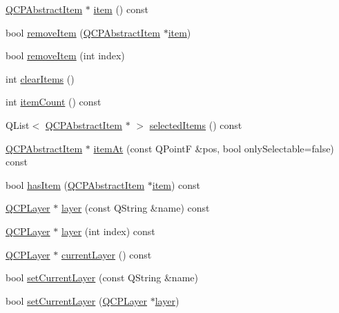 \begin{DoxyCompactItemize}
\item 
\mbox{\hyperlink{class_q_c_p_abstract_item}{Q\+C\+P\+Abstract\+Item}} $\ast$ \mbox{\hyperlink{class_q_custom_plot_a12eb2a283cf10a8a9176c01c0443e83e}{item}} () const
\item 
bool \mbox{\hyperlink{class_q_custom_plot_ae04446557292551e8fb6e2c106e1848d}{remove\+Item}} (\mbox{\hyperlink{class_q_c_p_abstract_item}{Q\+C\+P\+Abstract\+Item}} $\ast$\mbox{\hyperlink{class_q_custom_plot_ac042f2e78edd228ccf2f26b7fe215239}{item}})
\item 
bool \mbox{\hyperlink{class_q_custom_plot_abcfdda3d601c0441cab136137d715dea}{remove\+Item}} (int index)
\item 
int \mbox{\hyperlink{class_q_custom_plot_abdfd07d4f0591d0cf967f85013fd3645}{clear\+Items}} ()
\item 
int \mbox{\hyperlink{class_q_custom_plot_a16025daf0341f9362be3080e404424c2}{item\+Count}} () const
\item 
Q\+List$<$ \mbox{\hyperlink{class_q_c_p_abstract_item}{Q\+C\+P\+Abstract\+Item}} $\ast$ $>$ \mbox{\hyperlink{class_q_custom_plot_afda487bcf2d6cf1a57173d82495e29ba}{selected\+Items}} () const
\item 
\mbox{\hyperlink{class_q_c_p_abstract_item}{Q\+C\+P\+Abstract\+Item}} $\ast$ \mbox{\hyperlink{class_q_custom_plot_ac08578e0e6c059c83a8d340ba0038e8e}{item\+At}} (const Q\+PointF \&pos, bool only\+Selectable=false) const
\item 
bool \mbox{\hyperlink{class_q_custom_plot_af0b57f35646079f93fa6161a65b36109}{has\+Item}} (\mbox{\hyperlink{class_q_c_p_abstract_item}{Q\+C\+P\+Abstract\+Item}} $\ast$\mbox{\hyperlink{class_q_custom_plot_ac042f2e78edd228ccf2f26b7fe215239}{item}}) const
\item 
\mbox{\hyperlink{class_q_c_p_layer}{Q\+C\+P\+Layer}} $\ast$ \mbox{\hyperlink{class_q_custom_plot_a0a96244e7773b242ef23c32b7bdfb159}{layer}} (const Q\+String \&name) const
\item 
\mbox{\hyperlink{class_q_c_p_layer}{Q\+C\+P\+Layer}} $\ast$ \mbox{\hyperlink{class_q_custom_plot_acbb570f4c24306e7c2324d40bfe157c2}{layer}} (int index) const
\item 
\mbox{\hyperlink{class_q_c_p_layer}{Q\+C\+P\+Layer}} $\ast$ \mbox{\hyperlink{class_q_custom_plot_a0421d647f420b0b4c57aec1708857af5}{current\+Layer}} () const
\item 
bool \mbox{\hyperlink{class_q_custom_plot_a73a6dc47c653bb6f8f030abca5a11852}{set\+Current\+Layer}} (const Q\+String \&name)
\item 
bool \mbox{\hyperlink{class_q_custom_plot_a23a4d3cadad1a0063c5fe19aac5659e6}{set\+Current\+Layer}} (\mbox{\hyperlink{class_q_c_p_layer}{Q\+C\+P\+Layer}} $\ast$\mbox{\hyperlink{class_q_custom_plot_a0a96244e7773b242ef23c32b7bdfb159}{layer}})

\end{DoxyCompactItemize}
